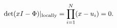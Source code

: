 \begin{equation}
\det (x I - \Phi)|_{{\rm locally}}=\prod_{i=1}^N (x-u_i)=0.
\label{ellipticcurve}
\end{equation}

